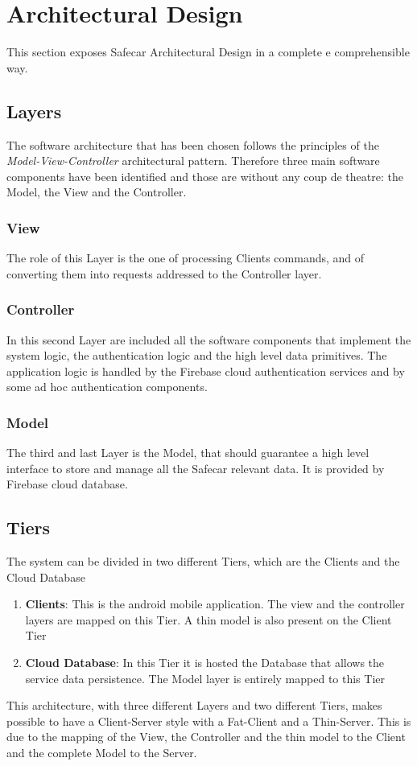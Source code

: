 \chapter{Architectural Design} \label{chap3}
This section exposes Safecar Architectural Design in a complete e comprehensible way.

\section{Layers}
The software architecture that has been chosen follows the principles of the \textit{Model-View-Controller} architectural pattern. Therefore three main software components have been identified and those are without any coup de theatre: the Model, the View and the Controller.

\subsection{View}
The role of this Layer is the one of processing Clients commands, and of converting them into requests addressed to the Controller layer.

\subsection{Controller}
In this second Layer are included all the software components that implement the system logic, the authentication logic and the high level data primitives. The application logic is handled by the Firebase cloud authentication services and by some ad hoc authentication components.

\subsection{Model}
The third and last Layer is the Model, that should guarantee a high level interface to store and manage all the Safecar relevant data. It is provided by Firebase cloud database.

\section{Tiers}
The system can be divided in two different Tiers, which are the Clients and the Cloud Database

\begin{enumerate}
	\item \textbf{Clients}: This is the android mobile application. The view and the controller layers are mapped on this Tier. A thin model is also present on the Client Tier
	\item \textbf{Cloud Database}: In this Tier it is hosted the Database that allows the service data persistence. The Model layer is entirely mapped to this Tier
\end{enumerate}
This architecture, with three different Layers and two different Tiers, makes possible to have a Client-Server style with a Fat-Client and a Thin-Server. This is due to the mapping of the View, the Controller and the thin model to the Client and the complete Model to the Server.

